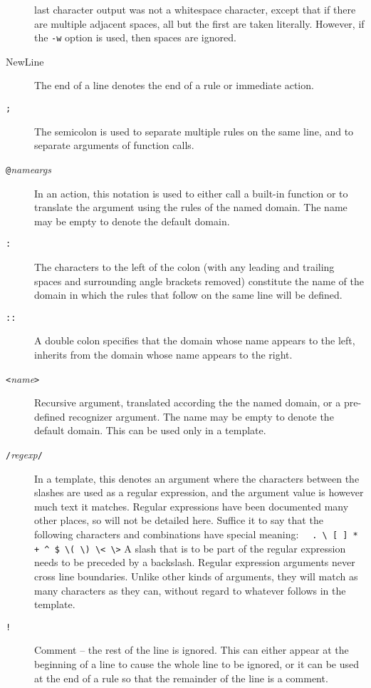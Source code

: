 \begin{description}
last character output was not a whitespace character, except that if
there are multiple adjacent spaces, all but the first are taken literally.
However, if the \verb/-w/ option is used, then spaces are ignored.
\item[NewLine]
The end of a line denotes the end of a rule or immediate action.
\item[{\tt ;}]
The semicolon is used to separate multiple rules on the same line, and
to separate arguments of function calls.
\item[{\tt @}{\it name}{\tt \ttlb }{\it args}{\tt \ttrb }]
In an action, this notation is used to either call a built-in function
or to translate the argument using the rules of the named domain.
The name may be empty to denote the default domain.
\item[{\tt :}]
The characters to the left of the colon (with any leading and trailing
spaces and surrounding angle brackets removed) constitute the name of
the domain in which the rules that follow on the same line will be defined.
\item[{\tt ::}]
A double colon specifies that the domain whose name appears to the left,
inherits from the domain whose name appears to the right.
\item[{\tt <}{\it name}{\tt >}]
Recursive argument, translated according the the named domain,
or a pre-defined recognizer argument.  The name may be empty to denote
the default domain.
This can be used only in a template.
\item[{\tt /}{\it regexp}{\tt /}]
In a template, this denotes an argument where
the characters between the slashes are used as a regular expression,
and the argument value is however much text it matches.
Regular expressions have been documented many other places, so will not
be detailed here.  Suffice it to say that the following characters and
combinations have special meaning:\newline
\verb|  . \ [ ] * + ^ $ \( \) \< \>|
\newline
A slash that is to be part of the regular expression needs to be
preceded by a backslash.
Regular expression arguments never cross line boundaries.
Unlike other kinds of arguments, they will match as many characters as
they can, without regard to whatever follows in the template.
\item[{\tt !}]
Comment -- the rest of the line is ignored.  This can either appear at
the beginning of a line to cause the whole line to be ignored, or it can
be used at the end of a rule so that the remainder of the line is a comment.
\end{description}


